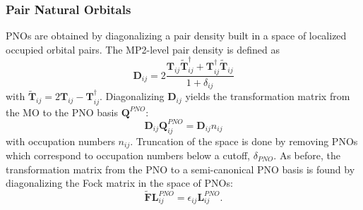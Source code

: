 \subsubsection{Pair Natural Orbitals}
PNOs are obtained by diagonalizing a pair density built in a space of localized occupied 
orbital pairs. The MP2-level pair density is defined as
\begin{equation} \label{eq:pair_D}
    \textbf{D}_{ij} = 2\frac{\textbf{T}_{ij}\tilde{\textbf{T}}_{ij}^\dagger + \textbf{T}_{ij}^\dagger\tilde{\textbf{T}}_{ij}}{1+\delta_{ij}}
\end{equation}
with $\tilde{\textbf{T}}_{ij} = 2\textbf{T}_{ij} - \textbf{T}_{ij}^\dagger$.
Diagonalizing $\textbf{D}_{ij}$ yields the transformation matrix from the MO to the PNO basis
$\textbf{Q}^{PNO}$:
\begin{equation} \label{eq:Q_pno}
    \textbf{D}_{ij}\textbf{Q}^{PNO}_{ij} = \textbf{D}_{ij}n_{ij}
\end{equation}
with occupation numbers $n_{ij}$. Truncation of the space is done by removing PNOs which 
correspond to occupation numbers below a cutoff, $\delta_{PNO}$. As before, the transformation
matrix from the PNO to a semi-canonical PNO basis is found by diagonalizing the Fock matrix
in the space of PNOs:
\begin{equation} \label{eq:L_pno}
    \tilde{\textbf{F}}\textbf{L}^{PNO}_{ij} = \epsilon_{ij}\textbf{L}^{PNO}_{ij}.
\end{equation}
